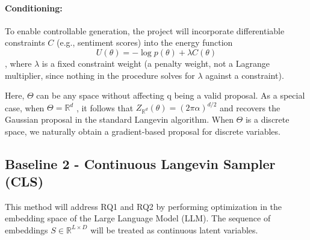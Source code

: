 \documentclass[11pt]{article}
\begin{document}
\paragraph{Conditioning:} To enable controllable generation,  the project will incorporate differentiable constraints $C$ (e.g., sentiment scores) into the energy function 
\[
U(\theta) = -\log p(\theta) + \lambda C(\theta)
\], where $\lambda$ is a fixed constraint weight (a penalty weight, not a Lagrange multiplier, since nothing in the procedure solves for $\lambda$ against a constraint).





Here, \(\Theta\) can be any space without affecting q being a valid
proposal. As a special case, when \(\Theta = \mathbb{R}^d \) , it follows that
\( Z_{\mathbb{R}^d}(\theta) = (2\pi\alpha)^{d/2}\)
and recovers the Gaussian proposal
in the standard Langevin algorithm. When \(\Theta\) is a discrete
space, we naturally obtain a gradient-based proposal for
discrete variables.



\subsection{Baseline 2  - Continuous Langevin Sampler (CLS)}

This method will address RQ1 and RQ2 by performing optimization in the embedding space of the Large Language Model (LLM). The sequence of embeddings $S \in \mathbb{R}^{L \times D}$ will be treated as continuous latent variables.
\end{document}
